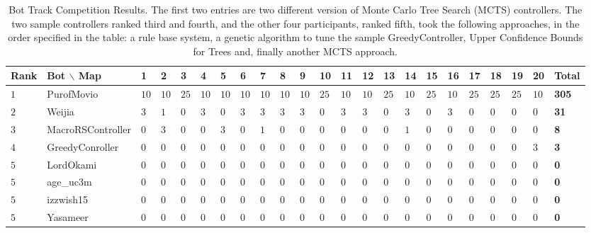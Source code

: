 \documentclass[conference]{IEEEtran}
\begin{document}
\begin{table}[!t]
	\centering
	\begin{tabular}{|>{\centering\arraybackslash}m{0.65cm}|>{\centering\arraybackslash}m{2.6cm}|p{0.19cm}|p{0.19cm}|p{0.19cm}|p{0.19cm}|p{0.19cm}|p{0.19cm}|p{0.19cm}|p{0.19cm}|p{0.19cm}|p{0.2cm}|p{0.2cm}|p{0.2cm}|p{0.2cm}|p{0.2cm}|p{0.2cm}|p{0.2cm}|p{0.2cm}|p{0.2cm}|p{0.2cm}|p{0.2cm}|>{\centering\arraybackslash}m{0.6cm}|}
		\hline	
		\textbf{Rank} & \textbf{Bot} $\backslash$ \textbf{Map}&\textbf{1}&\textbf{2}&\textbf{3}&\textbf{4}&\textbf{5}&\textbf{6}&\textbf{7}&\textbf{8}&\textbf{9}&\textbf{10}&\textbf{11}&\textbf{12}&\textbf{13}&\textbf{14}&\textbf{15}&\textbf{16}&\textbf{17}&\textbf{18}&\textbf{19}&\textbf{20}&\textbf{Total}\\
		\hline
$1$&PurofMovio&$10$&$10$&$25$&$10$&$10$&$10$&$10$&$10$&$10$&$25$&$10$&$10$&$25$&$10$&$25$&$10$&$25$&$25$&$25$&$10$&\textbf{305}\\
		\hline
$2$&Weijia&$3$&$1$&$0$&$3$&$0$&$3$&$3$&$3$&$3$&$0$&$3$&$3$&$0$&$3$&$0$&$3$&$0$&$0$&$0$&$0$&\textbf{31}\\
		\hline
$3$&MacroRSController&$0$&$3$&$0$&$0$&$3$&$0$&$1$&$0$&$0$&$0$&$0$&$0$&$0$&$1$&$0$&$0$&$0$&$0$&$0$&$0$&\textbf{8}\\
		\hline
$4$&GreedyConroller&$0$&$0$&$0$&$0$&$0$&$0$&$0$&$0$&$0$&$0$&$0$&$0$&$0$&$0$&$0$&$0$&$0$&$0$&$0$&$3$&\textbf{3}\\
		\hline
$5$&LordOkami&$0$&$0$&$0$&$0$&$0$&$0$&$0$&$0$&$0$&$0$&$0$&$0$&$0$&$0$&$0$&$0$&$0$&$0$&$0$&$0$&\textbf{0}\\
		\hline
$5$&age\_uc3m&$0$&$0$&$0$&$0$&$0$&$0$&$0$&$0$&$0$&$0$&$0$&$0$&$0$&$0$&$0$&$0$&$0$&$0$&$0$&$0$&\textbf{0}\\
		\hline
$5$&izzwish15&$0$&$0$&$0$&$0$&$0$&$0$&$0$&$0$&$0$&$0$&$0$&$0$&$0$&$0$&$0$&$0$&$0$&$0$&$0$&$0$&\textbf{0}\\
		\hline
$5$&Yasameer&$0$&$0$&$0$&$0$&$0$&$0$&$0$&$0$&$0$&$0$&$0$&$0$&$0$&$0$&$0$&$0$&$0$&$0$&$0$&$0$&\textbf{0}\\
		\hline
	\end{tabular}
	\caption{Bot Track Competition Results. The first two entries are two different version of Monte Carlo Tree Search (MCTS) controllers. The two sample controllers ranked third and fourth, and the other four participants, ranked fifth, took the following approaches, in the order specified in the table: a rule base system, a genetic algorithm to tune the sample GreedyController, Upper Confidence Bounds for Trees and, finally another MCTS approach.}
	\label{tab:res1}
\end{table}
\end{document}
